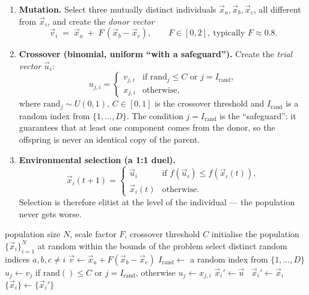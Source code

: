 \documentclass[11pt,a4paper]{article}
\theoremstyle{definition}
\providecommand{\uv}[1]{``#1''}
\begin{document}
\begin{enumerate}
\item \textbf{Mutation.} Select three mutually distinct individuals
  $\vec x_{a}, \vec x_{b}, \vec x_{c}$, all different from $\vec x_i$, and
  create the \emph{donor vector}
  \[
  \vec v_i \;=\; \vec x_{a} \;+\; F\,(\vec x_{b} - \vec x_{c}),
  \qquad F \in [0,2],\ \text{typically } F \approx 0.8 .
  \]
\item \textbf{Crossover (binomial, uniform \uv{with a safeguard}).}
  Create the \emph{trial vector} $\vec u_i$:
  \[
  u_{j,i} =
  \begin{cases}
  v_{j,i} & \text{if } \mathrm{rand}_j \le C \text{ or } j = I_{\mathrm{rand}},\\[2pt]
  x_{j,i} & \text{otherwise},
  \end{cases}
  \]
  where $\mathrm{rand}_j \sim U(0,1)$, $C \in [0,1]$ is the crossover threshold
  and $I_{\mathrm{rand}}$ is a random index from $\{1,\dots,D\}$. The condition
  $j = I_{\mathrm{rand}}$ is the \uv{safeguard}: it guarantees that at least one
  component comes from the donor, so the offspring is never an identical copy of
  the parent.
\item \textbf{Environmental selection (a 1:1 duel).}
  \[
  \vec x_i(t+1) =
  \begin{cases}
  \vec u_i & \text{if } f(\vec u_i) \le f(\vec x_i(t)),\\
  \vec x_i(t) & \text{otherwise.}
  \end{cases}
  \]
  Selection is therefore elitist at the level of the individual --- the
  population never gets worse.
\end{enumerate}

\begin{algorithm}[!ht]
\caption{DE/rand/1/bin}
\begin{algorithmic}[1]
\Require population size $N$, scale factor $F$, crossover threshold $C$
\State initialise the population $\{\vec x_i\}_{i=1}^{N}$ at random within the bounds of the problem
    \State select distinct random indices $a,b,c \ne i$
    \State $\vec v \gets \vec x_a + F(\vec x_b - \vec x_c)$
    \State $I_{\mathrm{rand}} \gets$ a random index from $\{1,\dots,D\}$
      \State $u_j \gets v_j$ if $\mathrm{rand}() \le C$ or $j = I_{\mathrm{rand}}$, otherwise $u_j \gets x_{j,i}$
    \EndFor
     $\vec x_i' \gets \vec u$ \Else\ $\vec x_i' \gets \vec x_i$ \EndIf
  \EndFor
  \State $\{\vec x_i\} \gets \{\vec x_i'\}$
\EndWhile
\end{algorithmic}
\end{algorithm}
\end{document}

